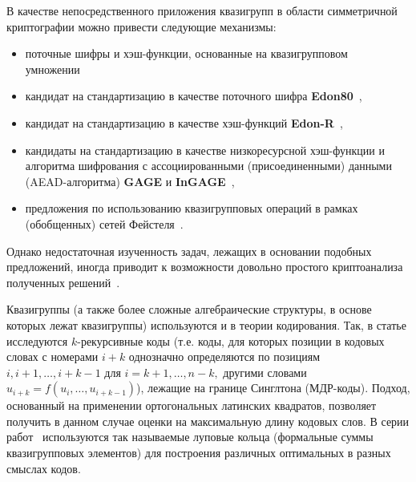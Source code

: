     В качестве непосредственного приложения квазигрупп в области симметричной криптографии можно привести следующие механизмы:
    \begin{itemize}
        \item поточные шифры и хэш-функции, основанные на квазигрупповом умножении~\autocite{markovski1999quasigroup, markovski2003quasigroup, markovski2017quasigroup, snavsel2009hash}
        \item кандидат на стандартизацию в качестве поточного шифра \textbf{Edon80}~\autocite{edon80},
        \item кандидат на стандартизацию в качестве хэш-функций \textbf{Edon-R}~\autocite{EdonR, EdonRprime},
        \item кандидаты на стандартизацию в качестве низкоресурсной хэш-функции и алгоритма шифрования с ассоциированными (присоединенными) данными (AEAD-алгоритма) \textbf{GAGE} и \textbf{InGAGE}~\autocite{otte2019gage, gligoroski2019s},
        \item предложения по использованию квазигрупповых операций в рамках (обобщенных) сетей Фейстеля~\autocite{tecseleanu2021quasigroups, tecseleanu2022security, tecseleanu2023cryptographic, cherednik17, cherednik19, cherednik20}.
    \end{itemize}
    Однако недостаточная изученность задач, лежащих в основании подобных предложений, иногда приводит к возможности довольно простого криптоанализа полученных решений~\autocite{vojvoda2004cryptanalysis, slaminkova2010cryptanalysis, hell2007key, vojvoda2007note}.

    Квазигруппы (а также более сложные алгебраические структуры, в основе которых лежат квазигруппы) используются и в теории кодирования.
    Так, в статье \autocite{nechaev98} исследуются $k$-рекурсивные коды (т.е. коды, для которых позиции в кодовых словах с номерами $i+k$ однозначно определяются по позициям $i, i+1, \ldots, i+k-1$ для $i = k+1, \ldots, n-k,$ другими словами $u_{i+k} = f(u_i, \ldots, u_{i+k-1})$), лежащие на границе Синглтона (МДР-коды).
    Подход, основанный на применении ортогональных латинских квадратов, позволяет получить в данном случае оценки на максимальную длину кодовых слов.
    В серии работ~\autocite{nechaev04, couselo2004loop, markov12, markov2020nonassociative} используются так называемые луповые кольца (формальные суммы квазигрупповых элементов) для построения различных оптимальных в разных смыслах кодов.

